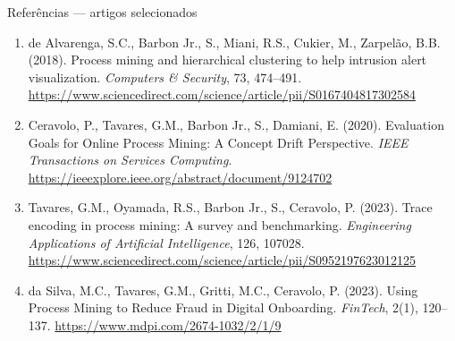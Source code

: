 \documentclass[aspectratio=169,11pt]{beamer}
\begin{document}
\begin{frame}[shrink=8]{Referências — artigos selecionados}
  \small
  \begin{enumerate}
    \item de Alvarenga, S.C., Barbon Jr., S., Miani, R.S., Cukier, M.,
      Zarpelão, B.B. (2018). Process mining and hierarchical clustering to
      help intrusion alert visualization. \textit{Computers \& Security},
      73, 474--491.
      \url{https://www.sciencedirect.com/science/article/pii/S0167404817302584}

    \item Ceravolo, P., Tavares, G.M., Barbon Jr., S., Damiani, E. (2020).
      Evaluation Goals for Online Process Mining: A Concept Drift
      Perspective. \textit{IEEE Transactions on Services Computing}.
      \url{https://ieeexplore.ieee.org/abstract/document/9124702}

    \item Tavares, G.M., Oyamada, R.S., Barbon Jr., S., Ceravolo, P.
      (2023). Trace encoding in process mining: A survey and benchmarking.
      \textit{Engineering Applications of Artificial Intelligence}, 126,
      107028.
      \url{https://www.sciencedirect.com/science/article/pii/S0952197623012125}

    \item da Silva, M.C., Tavares, G.M., Gritti, M.C., Ceravolo, P.
      (2023). Using Process Mining to Reduce Fraud in Digital Onboarding.
      \textit{FinTech}, 2(1), 120--137.
      \url{https://www.mdpi.com/2674-1032/2/1/9}
  \end{enumerate}
\end{frame}
\end{document}
